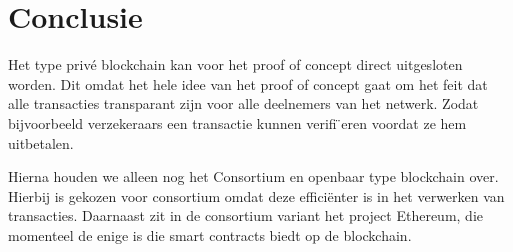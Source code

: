 \chapter{Conclusie}\label{chap:conclusion}
Het type privé blockchain kan voor het proof of concept direct uitgesloten worden. Dit omdat het hele idee van het proof of concept gaat om het feit dat alle transacties transparant zijn voor alle deelnemers van het netwerk. Zodat bijvoorbeeld verzekeraars een transactie kunnen verifi ̈eren voordat ze hem uitbetalen.

Hierna houden we alleen nog het Consortium en openbaar type blockchain over. Hierbij is gekozen voor consortium omdat deze efficiënter is in het verwerken van transacties. Daarnaast zit in de consortium variant het project Ethereum, die momenteel de enige is die smart contracts biedt op de blockchain.
